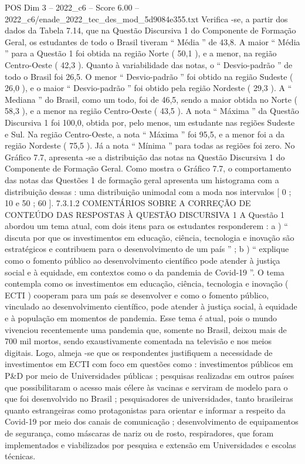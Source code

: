 \begin{textsample}{POS Dim 3 – 2022\_c6 – Score 6.00 – 2022\_c6/enade\_2022\_tec\_des\_mod\_5d9084e355.txt}
Verifica -se, a partir dos dados da Tabela 7.14, que na Questão Discursiva 1 do Componente de Formação Geral, os estudantes de todo o Brasil tiveram “ Média ” de 43,8.
A maior “ Média ” para a Questão 1 foi obtida na região Norte ( 50,1 ), e a menor, na região Centro-Oeste ( 42,3 ).
Quanto à variabilidade das notas, o “ Desvio-padrão ” de todo o Brasil foi 26,5.
O menor “ Desvio-padrão ” foi obtido na região Sudeste ( 26,0 ), e o maior “ Desvio-padrão ” foi obtido pela região Nordeste ( 29,3 ).
A “ Mediana ” do Brasil, como um todo, foi de 46,5, sendo a maior obtida no Norte ( 58,3 ), e a menor na região Centro-Oeste ( 43,5 ).
A nota “ Máxima ” da Questão Discursiva 1 foi 100,0, obtida por, pelo menos, um estudante nas regiões Sudeste e Sul.
Na região Centro-Oeste, a nota “ Máxima ” foi 95,5, e a menor foi a da região Nordeste ( 75,5 ).
Já a nota “ Mínima ” para todas as regiões foi zero.
No Gráfico 7.7, apresenta -se a distribuição das notas na Questão Discursiva 1 do Componente de Formação Geral.
Como mostra o Gráfico 7.7, o comportamento das notas das Questões 1 de formação geral apresenta um histograma com a distribuição dessas : uma distribuição unimodal com a moda nos intervalos [ 0 ; 10 e 50 ; 60 ]. 7.3.1.2 COMENTÁRIOS SOBRE A CORREÇÃO DE CONTEÚDO DAS RESPOSTAS À QUESTÃO DISCURSIVA 1 A Questão 1 abordou um tema atual, com dois itens para os estudantes responderem : a ) “ discuta por que os investimentos em educação, ciência, tecnologia e inovação são estratégicos e contribuem para o desenvolvimento de um país ” ; b ) “ explique como o fomento público ao desenvolvimento científico pode atender à justiça social e à equidade, em contextos como o da pandemia de Covid-19 ”.
O tema contempla como os investimentos em educação, ciência, tecnologia e inovação ( ECTI ) cooperam para um país se desenvolver e como o fomento público, vinculado ao desenvolvimento científico, pode atender à justiça social, à equidade e à população em momentos de pandemia.
Esse tema é atual, pois o mundo vivenciou recentemente uma pandemia que, somente no Brasil, deixou mais de 700 mil mortos, sendo exaustivamente comentada na televisão e nos meios digitais.
Logo, almeja -se que os respondentes justifiquem a necessidade de investimentos em ECTI com foco em questões como : investimentos públicos em P\&D por meio de Universidades públicas ; pesquisas realizadas em outros países que possibilitaram o acesso mais célere às vacinas e serviram de modelo para o que foi desenvolvido no Brasil ; pesquisadores de universidades, tanto brasileiras quanto estrangeiras como protagonistas para orientar e informar a respeito da Covid-19 por meio dos canais de comunicação ; desenvolvimento de equipamentos de segurança, como máscaras de nariz ou de rosto, respiradores, que foram implementados e viabilizados por pesquisa e extensão em Universidades e escolas técnicas.

\end{textsample}
